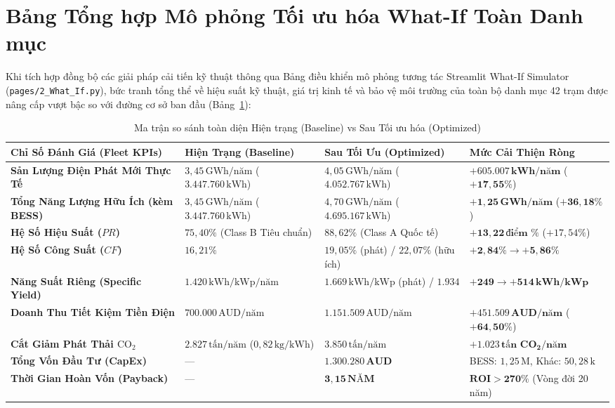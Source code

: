 \documentclass[12pt, a4paper]{report}
\begin{document}
\section{Bảng Tổng hợp Mô phỏng Tối ưu hóa What-If Toàn Danh mục}
\label{sec:what_if_fleet_matrix}

Khi tích hợp đồng bộ các giải pháp cải tiến kỹ thuật thông qua Bảng điều khiển mô phỏng tương tác Streamlit What-If Simulator (\texttt{pages/2\_What\_If.py}), bức tranh tổng thể về hiệu suất kỹ thuật, giá trị kinh tế và bảo vệ môi trường của toàn bộ danh mục 42 trạm được nâng cấp vượt bậc so với đường cơ sở ban đầu (Bảng~\ref{tab:what_if_fleet_comparison}):

\begin{table}[H]
\centering
\caption{Ma trận so sánh toàn diện Hiện trạng (Baseline) vs Sau Tối ưu hóa (Optimized)}
\label{tab:what_if_fleet_comparison}
\small
\renewcommand{\arraystretch}{1.3}
\begin{tabularx}{\textwidth}{@{} >{\raggedright\arraybackslash}p{4.8cm} >{\raggedright\arraybackslash}X >{\raggedright\arraybackslash}X >{\raggedright\arraybackslash}X @{}}
\toprule
\textbf{Chỉ Số Đánh Giá (Fleet KPIs)} & \textbf{Hiện Trạng (Baseline)} & \textbf{Sau Tối Ưu (Optimized)} & \textbf{Mức Cải Thiện Ròng} \\
\midrule
\textbf{Sản Lượng Điện Phát Mới Thực Tế} & $3{,}45\,\text{GWh/năm}$ ($3.447.760\,\text{kWh}$) & $4{,}05\,\text{GWh/năm}$ ($4.052.767\,\text{kWh}$) & $\mathbf{+605.007\,\text{kWh/năm}}$ ($\mathbf{+17{,}55\%}$) \\
\textbf{Tổng Năng Lượng Hữu Ích (kèm BESS)} & $3{,}45\,\text{GWh/năm}$ ($3.447.760\,\text{kWh}$) & $4{,}70\,\text{GWh/năm}$ ($4.695.167\,\text{kWh}$) & $\mathbf{+1{,}25\,\text{GWh/năm}}$ ($\mathbf{+36{,}18\%}$) \\
\textbf{Hệ Số Hiệu Suất ($PR$)} & $75{,}40\%$ (Class B Tiêu chuẩn) & $88{,}62\%$ (Class A Quốc tế) & $\mathbf{+13{,}22\,\text{điểm \%}}$ ($+17{,}54\%$) \\
\textbf{Hệ Số Công Suất ($CF$)} & $16{,}21\%$ & $19{,}05\%$ (phát) / $22{,}07\%$ (hữu ích) & $\mathbf{+2{,}84\% \to +5{,}86\%}$ \\
\textbf{Năng Suất Riêng (Specific Yield)} & $1.420\,\text{kWh/kWp/năm}$ & $1.669\,\text{kWh/kWp}$ (phát) / $1.934$ & $\mathbf{+249 \to +514\,\text{kWh/kWp}}$ \\
\textbf{Doanh Thu Tiết Kiệm Tiền Điện} & $700.000\,\text{AUD/năm}$ & $1.151.509\,\text{AUD/năm}$ & $\mathbf{+451.509\,\text{AUD/năm}}$ ($\mathbf{+64{,}50\%}$) \\
\textbf{Cắt Giảm Phát Thải $\text{CO}_2$} & $2.827\,\text{tấn/năm}$ ($0{,}82\,\text{kg/kWh}$) & $3.850\,\text{tấn/năm}$ & $\mathbf{+1.023\,\text{tấn CO}_2\text{/năm}}$ \\
\midrule
\textbf{Tổng Vốn Đầu Tư (CapEx)} & — & $\mathbf{1.300.280\,\text{AUD}}$ & BESS: $1{,}25\,\text{M}$, Khác: $50{,}28\,\text{k}$ \\
\textbf{Thời Gian Hoàn Vốn (Payback)} & — & $\mathbf{3{,}15\,\text{NĂM}}$ & $\mathbf{\text{ROI} > 270\%}$ (Vòng đời 20 năm) \\
\bottomrule
\end{tabularx}
\end{table}
\end{document}
